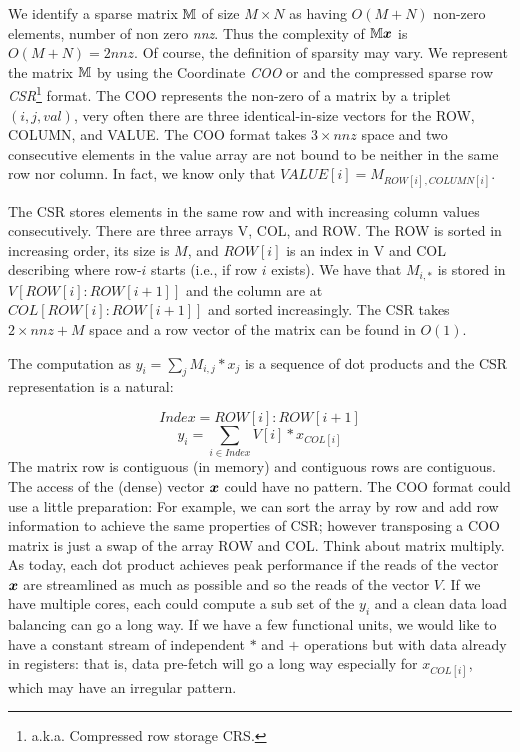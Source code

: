 \documentclass[manuscript,screen]{acmart}
\begin{document}
We identify a sparse matrix $\mathbb{M}$ of size $M\times N$ as having
$O(M+N)$ non-zero elements, number of non zero {\em nnz}. Thus the
complexity of $\mathbb{M} {\boldsymbol x}$ is $O(M+N) = 2nnz$. Of course, the
definition of sparsity may vary. We represent the matrix $\mathbb{M}$ by using
the Coordinate {\em COO} or and the compressed sparse row {\em
  CSR}\footnote{a.k.a. Compressed row storage {\rm CRS}.}  format. The
COO represents the non-zero of a matrix by a triplet $(i,j,val)$, very
often there are three identical-in-size vectors for the ROW, COLUMN,
and VALUE. The COO format takes $3\times nnz$ space and two
consecutive elements in the value array are not bound to be neither in
the same row nor column. In fact, we know only that $VALUE[i] =
M_{ROW[i],COLUMN[i]}$.

The CSR stores elements in the same row and with increasing column
values consecutively. There are three arrays V, COL, and ROW. The ROW
is sorted in increasing order, its size is $M$, and $ROW[i]$ is an
index in V and COL describing where row-$i$ starts (i.e., if row $i$
exists).  We have that $M_{i,*}$ is stored in $V[ROW[i]:ROW[i+1]]$ and
the column are at $COL[ROW[i]:ROW[i+1]]$ and sorted increasingly. The
CSR takes $2\times nnz + M$ space and a row vector of the matrix can
be found in $O(1)$.
 
The computation as $y_i = \sum_j M_{i,j}*x_j$ is a sequence of dot
products and the CSR representation is a natural:

\[ Index = ROW[i]:ROW[i+1] \]
\[
y_i =  \sum_{i\in Index} V[i] * x_{COL[i]}  
\]
The matrix row is contiguous (in memory) and contiguous rows are
contiguous. The access of the (dense) vector ${\boldsymbol x}$ could have no
pattern. The COO format could use a little preparation: For example,
we can sort the array by row and add row information to achieve the
same properties of CSR; however transposing a COO matrix is just a
swap of the array ROW and COL. Think about matrix multiply. As today,
each dot product achieves peak performance if the reads of the vector
${\boldsymbol x}$ are streamlined as much as possible and so the reads of the
vector $V$. If we have multiple cores, each could compute a sub set of
the $y_i$ and a clean data load balancing can go a long way. If we
have a few functional units, we would like to have a constant stream
of independent $*$ and $+$ operations but with data already in
registers: that is, data pre-fetch will go a long way especially for
$x_{COL[i]}$, which may have an irregular pattern.
\end{document}
